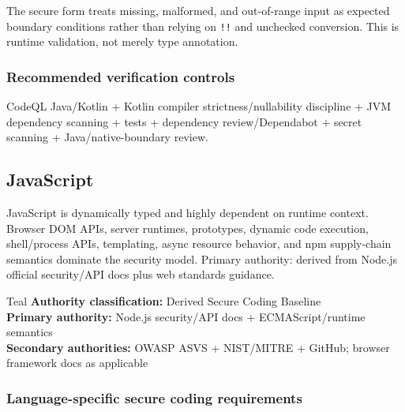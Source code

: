 \documentclass[10pt,letterpaper]{article}
\newcommand{\code}[1]{\texttt{\small #1}}
\begin{document}
The secure form treats missing, malformed, and out-of-range input as expected boundary conditions rather than relying on \code{!!} and unchecked conversion. This is runtime validation, not merely type annotation.\par
\subsubsection*{Recommended verification controls}
CodeQL Java/Kotlin + Kotlin compiler strictness/nullability discipline + JVM dependency scanning + tests + dependency review/Dependabot + secret scanning + Java/native-boundary review.
\clearpage
\subsection{JavaScript}
JavaScript is dynamically typed and highly dependent on runtime context. Browser DOM APIs, server runtimes, prototypes, dynamic code execution, shell/process APIs, templating, async resource behavior, and npm supply-chain semantics dominate the security model. Primary authority: derived from Node.js official security/API docs plus web standards guidance.
\begin{callout}{Teal}
\textbf{Authority classification:} Derived Secure Coding Baseline\\
\textbf{Primary authority:} Node.js security/API docs + ECMAScript/runtime semantics\\
\textbf{Secondary authorities:} OWASP ASVS + NIST/MITRE + GitHub; browser framework docs as applicable
\end{callout}
\subsubsection*{Language-specific secure coding requirements}
\end{document}
